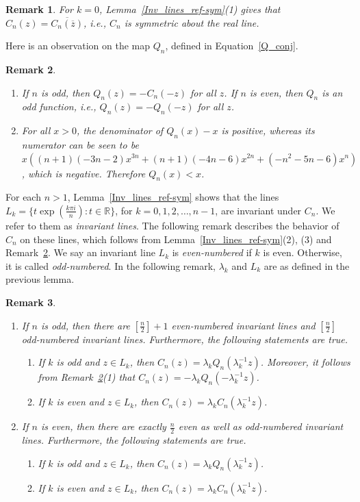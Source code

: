 \documentclass[12pt]{article}
\newtheorem{rem}{Remark}[section]
\begin{document}
\begin{rem}
	For $k=0$, Lemma~\ref{Inv_lines_ref-sym}(1) gives that 
	$C_n (z)=\overline{C_n(\overline{z})}$, i.e., $C_n$ is symmetric about the real line.
	\label{symm-R}
\end{rem}
Here is an observation on the map $Q_n$, defined in Equation~\eqref{Q_conj}.
\begin{rem}
	\begin{enumerate}
	\item 
If $n$ is odd, then  $Q_n (z)=-C_n(-z)$  for all $z$.
If $n$ is even, then $Q_n$ is an odd function, i.e., $Q_n (z)=-Q_n(-z)$  for all $z$. 
\item For all $x>0$, the denominator of $Q_n (x)-x$ is positive, whereas its  numerator can be seen to be $ x((n+1) (-3n -2)x^{3n} +(n+1)(-4n -6)x^{2n} +(-n^2-5n -6)x^n)$, which is negative. Therefore $Q_n (x) < x$. 
\end{enumerate}
 \label{Qn-obs}
\end{rem}	
For each $n>1$, Lemma~\ref{Inv_lines_ref-sym} shows that the lines $L_k =\{t \exp(\frac{k \pi i}{n}): t \in \mathbb{R}\}$, for $k=0, 1, 2, \dots, n-1$, are invariant under $C_n$. We refer to them as \textit{invariant lines}. The following remark describes the behavior of $C_n$ on these  lines, which follows from Lemma~\ref{Inv_lines_ref-sym}(2), (3) and Remark~\ref{Qn-obs}. We say an invariant line $L_k$ is \textit{even-numbered} if $k$ is even. Otherwise, it is called \textit{odd-numbered}. In the following remark,  $\lambda_k$ and $L_k$ are as defined in the previous lemma.
\begin{rem}
	\begin{enumerate}
		\item If $n$ is odd, then there are $[\frac{n}{2}]+1$ even-numbered invariant lines and  $[\frac{n}{2}]$ odd-numbered invariant lines. Furthermore, the following statements are true.
		\begin{enumerate}
				\item 
				If $k$ is odd and $z \in L_k$, then $C_n (z)=\lambda_k Q_n(\lambda_k ^{-1}z)$. Moreover, it follows from Remark~\ref{Qn-obs}(1) that  
				$C_n (z)=-\lambda_k Q_n(-\lambda_k ^{-1}z)$.
				
				\item If $k$ is even and $z \in L_k$, then $C_n (z)= \lambda_k C_n(\lambda_k ^{-1}z)$. 				
				
		\end{enumerate}
		\item  If $n$ is even, then there are exactly $\frac{n}{2}$ even as well as odd-numbered invariant lines. Furthermore, the following statements are true.
		
		\begin{enumerate}
				\item 	If $k$ is odd and $z \in L_k$, then $C_n (z)= \lambda_{k} Q_{n}(\lambda_{k}^{-1} z) $.
				\item If $k$ is even and $z \in L_k$, then $C_n (z)=\lambda_k C_n(\lambda_k ^{-1}z)$.
				
		\end{enumerate}
	\end{enumerate}
	\label{dynamics-invariantlines}
\end{rem}	
\end{document}
